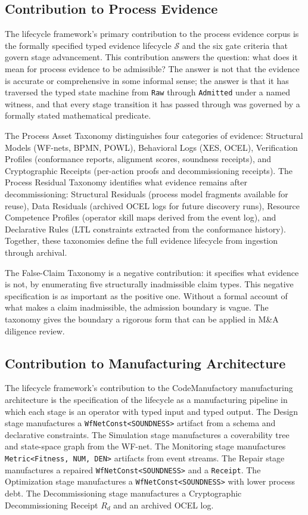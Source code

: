 \subsection{Contribution to Process Evidence}
\label{sec:lifecycle-contribution-evidence}

The lifecycle framework's primary contribution to the process evidence corpus is the
formally specified typed evidence lifecycle $\mathcal{S}$ and the six gate criteria
that govern stage advancement. This contribution answers the question: what does it mean
for process evidence to be admissible? The answer is not that the evidence is accurate
or comprehensive in some informal sense; the answer is that it has traversed the typed
state machine from \texttt{Raw} through \texttt{Admitted} under a named witness, and
that every stage transition it has passed through was governed by a formally stated
mathematical predicate.

The Process Asset Taxonomy distinguishes four categories of evidence: Structural Models
(WF-nets, BPMN, POWL), Behavioral Logs (XES, OCEL), Verification Profiles (conformance
reports, alignment scores, soundness receipts), and Cryptographic Receipts (per-action
proofs and decommissioning receipts). The Process Residual Taxonomy identifies what
evidence remains after decommissioning: Structural Residuals (process model fragments
available for reuse), Data Residuals (archived OCEL logs for future discovery runs),
Resource Competence Profiles (operator skill maps derived from the event log), and
Declarative Rules (LTL constraints extracted from the conformance history). Together,
these taxonomies define the full evidence lifecycle from ingestion through archival.

The False-Claim Taxonomy is a negative contribution: it specifies what evidence is not,
by enumerating five structurally inadmissible claim types. This negative specification
is as important as the positive one. Without a formal account of what makes a claim
inadmissible, the admission boundary is vague. The taxonomy gives the boundary a
rigorous form that can be applied in M\&A diligence review.

\subsection{Contribution to Manufacturing Architecture}
\label{sec:lifecycle-contribution-manufacturing}

The lifecycle framework's contribution to the CodeManufactory manufacturing architecture
is the specification of the lifecycle as a manufacturing pipeline in which each stage
is an operator with typed input and typed output. The Design stage manufactures a
\texttt{WfNetConst<SOUNDNESS>} artifact from a schema and declarative constraints. The
Simulation stage manufactures a coverability tree and state-space graph from the WF-net.
The Monitoring stage manufactures \texttt{Metric<Fitness, NUM, DEN>} artifacts from
event streams. The Repair stage manufactures a repaired \texttt{WfNetConst<SOUNDNESS>}
and a \texttt{Receipt}. The Optimization stage manufactures a
\texttt{WfNetConst<SOUNDNESS>} with lower process debt. The Decommissioning stage
manufactures a Cryptographic Decommissioning Receipt $R_d$ and an archived OCEL log.

